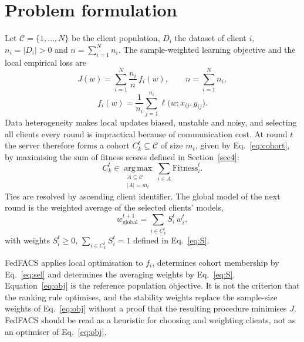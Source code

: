\documentclass[pdflatex,sn-basic]{sn-jnl}
\newcommand{\Fit}{\mathrm{Fitness}}
\begin{document}
\section{Problem formulation}\label{sec3}

Let $\mathcal{C}=\{1,\dots,N\}$ be the client population, $D_i$ the dataset of client $i$, $n_i=|D_i|>0$ and $n=\sum_{i=1}^{N}n_i$. The sample-weighted learning objective and the local empirical loss are
\begin{equation}\label{eq:obj}
J(w)=\sum_{i=1}^{N}\frac{n_i}{n}\,f_i(w),\qquad n=\sum_{i=1}^{N}n_i,
\end{equation}
\begin{equation}\label{eq:loss}
f_i(w)=\frac{1}{n_i}\sum_{j=1}^{n_i}\ell\bigl(w;x_{ij},y_{ij}\bigr).
\end{equation}
Data heterogeneity makes local updates biased, unstable and noisy, and selecting all clients every round is impractical because of communication cost. At round $t$ the server therefore forms a cohort $C_k^t\subseteq\mathcal{C}$ of size $m_t$, given by Eq.~\eqref{eq:cohort}, by maximising the sum of fitness scores defined in Section~\ref{sec4}:
\begin{equation}\label{eq:sel}
C_k^t\in\operatorname*{arg\,max}_{\substack{A\subseteq\mathcal{C}\\|A|=m_t}}\ \sum_{i\in A}\Fit_i^t .
\end{equation}
Ties are resolved by ascending client identifier. The global model of the next round is the weighted average of the selected clients' models,
\begin{equation}\label{eq:agg}
w_{\mathrm{global}}^{t+1}=\sum_{i\in C_k^t}S_i^t\,w_i^t,
\end{equation}
with weights $S_i^t\ge 0$, $\sum_{i\in C_k^t}S_i^t=1$ defined in Eq.~\eqref{eq:S}.

FedFACS applies local optimisation to $f_i$, determines cohort membership by Eq.~\eqref{eq:sel} and determines the averaging weights by Eq.~\eqref{eq:S}. Equation~\eqref{eq:obj} is the reference population objective. It is not the criterion that the ranking rule optimises, and the stability weights replace the sample-size weights of Eq.~\eqref{eq:obj} without a proof that the resulting procedure minimises $J$. FedFACS should be read as a heuristic for choosing and weighting clients, not as an optimiser of Eq.~\eqref{eq:obj}.

\end{document}
